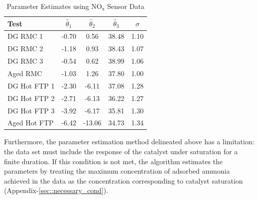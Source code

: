 \documentclass[subscriptcorrection,upint,varvw,barcolor=Goldenrod3,mathalfa=cal=euler,balance,hyphenate,french,pdf-a]{asmejour}
\newcommand{\nox}{\text{NO}_{\text{x}}}
\begin{document}
\begin{table}[ht]
        \centering
        \caption{Parameter Estimates using $\nox$ Sensor Data}
        \label{tab::parm_nox}
        \begin{tabular}{l c c c c}
                \hline \hline
                Test         & $\hat \theta_1 $ & $\hat \theta_2 $ & $\hat \theta_3 $ & $\sigma$ \\ \hline \hline
                DG RMC 1     & -0.70            & 0.56             & 38.48            & 1.10     \\
                DG RMC 2     & -1.18            & 0.93             & 38.43            & 1.07     \\
                DG RMC 3     & -0.54            & 0.62             & 38.99            & 1.06     \\
                Aged RMC     & -1.03            & 1.26             & 37.80            & 1.00     \\ \hline
                DG Hot FTP 1 & -2.30            & -6.11            & 37.08            & 1.28     \\
                DG Hot FTP 2 & -2.71            & -6.13            & 36.22            & 1.27     \\
                DG Hot FTP 3 & -3.92            & -6.17            & 35.81            & 1.30     \\
                Aged Hot FTP & -6.42            & -13.06           & 34.73            & 1.34     \\
                \hline\hline
        \end{tabular}
\end{table}
\par Furthermore, the parameter estimation method delineated above has a limitation: the data set must include the response of the catalyst under saturation for a finite duration. If this condition is not met, the algorithm estimates the parameters by treating the maximum concentration of adsorbed ammonia achieved in the data as the concentration corresponding to catalyst saturation (Appendix-\ref{sec::necessary_cond}).
\end{document}
